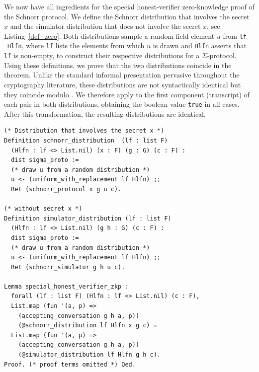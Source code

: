 \documentclass[sigconf,anonymous,review]{acmart}
\begin{document}
  
We now have all ingredients for the special honest-verifier zero-knowledge proof of the Schnorr protocol. We define the 
Schnorr distribution \texttt{}
that involves the secret $x$ and 
the simulator distribution \texttt{}
that does not involve the secret $x$, see Listing~\ref{def_zero}. 
Both distributions sample a random field element $u$ from 
\texttt{} \texttt{lf} \ \texttt{Hlfn}, 
where \texttt{lf} lists the elements from which $u$ is drawn and 
\texttt{Hlfn} asserts that \texttt{lf} is non-empty, 
to construct their respective distributions for a $\Sigma$-protocol.
Using these definitions, we prove that the two distributions coincide in the 
\texttt{} theorem. Unlike the standard informal 
presentation pervasive throughout the cryptography literature, these distributions 
are not syntactically identical but they coincide modulo 
\texttt{}. We therefore apply \texttt{} 
to the first component (transcript) of each pair in both distributions, obtaining 
the boolean value \texttt{true} in all cases. After this transformation, the 
resulting distributions are identical.


\begin{lstlisting}[frame=single, language=Coq, caption={Special Honest-Verifier Zero-Knowledge Proof},
  label={def_zero},captionpos=t, basicstyle=\ttfamily\footnotesize,
  abovecaptionskip=-\medskipamount]
(* Distribution that involves the secret x *)
Definition schnorr_distribution  (lf : list F) 
  (Hlfn : lf <> List.nil) (x : F) (g : G) (c : F) : 
  dist sigma_proto :=
  (* draw u from a random distribution *)
  u <- (uniform_with_replacement lf Hlfn) ;;
  Ret (schnorr_protocol x g u c).

(* without secret x *)
Definition simulator_distribution (lf : list F) 
  (Hlfn : lf <> List.nil) (g h : G) (c : F) : 
  dist sigma_proto :=
  (* draw u from a random distribution *)
  u <- (uniform_with_replacement lf Hlfn) ;;
  Ret (schnorr_simulator g h u c).
  
Lemma special_honest_verifier_zkp : 
  forall (lf : list F) (Hlfn : lf <> List.nil) (c : F), 
  List.map (fun '(a, p) => 
    (accepting_conversation g h a, p))
    (@schnorr_distribution lf Hlfn x g c) = 
  List.map (fun '(a, p) => 
    (accepting_conversation g h a, p))
    (@simulator_distribution lf Hlfn g h c).
Proof. (* proof terms omitted *) Qed. 
\end{lstlisting}
\end{document}
